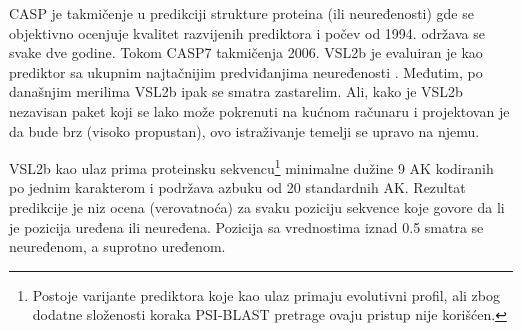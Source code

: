 CASP  je takmičenje u
predikciji strukture proteina (ili neuređenosti) gde se objektivno ocenjuje
kvalitet razvijenih prediktora i počev od 1994. održava se svake dve godine.
Tokom CASP7 takmičenja 2006. VSL2b je evaluiran je kao prediktor sa ukupnim
najtačnijim predviđanjima neuređenosti \parencite{He2009}. Međutim, po
današnjim merilima \parencite{Meng2017} VSL2b ipak se smatra zastarelim.  Ali,
kako je VSL2b nezavisan paket koji se lako može pokrenuti na kućnom računaru i
projektovan je da bude brz (visoko propustan), ovo istraživanje temelji se
upravo na njemu.

VSL2b kao ulaz prima proteinsku sekvencu\footnote{
  Postoje varijante prediktora koje kao ulaz primaju evolutivni profil, ali zbog
  dodatne složenosti koraka PSI-BLAST pretrage ovaju pristup nije korišćen.
}
minimalne dužine 9 AK kodiranih po jednim
karakterom i podržava azbuku od 20 standardnih AK. Rezultat predikcije je niz
ocena (verovatnoća) za svaku poziciju sekvence
koje govore da li je pozicija uređena ili neuređena. Pozicija sa vrednostima iznad
0.5 smatra se neuređenom, a suprotno uređenom.





